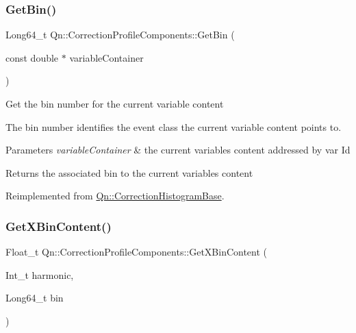 \subsubsection{\texorpdfstring{Get\+Bin()}{GetBin()}}
{\footnotesize\ttfamily Long64\+\_\+t Qn\+::\+Correction\+Profile\+Components\+::\+Get\+Bin (\begin{DoxyParamCaption}\item[{const double $\ast$}]{variable\+Container }\end{DoxyParamCaption})\hspace{0.3cm}{\ttfamily [virtual]}}

Get the bin number for the current variable content

The bin number identifies the event class the current variable content points to.


\begin{DoxyParams}{Parameters}
{\em variable\+Container} & the current variables content addressed by var Id \\
\hline
\end{DoxyParams}
\begin{DoxyReturn}{Returns}
the associated bin to the current variables content 
\end{DoxyReturn}


Reimplemented from \mbox{\hyperlink{classQn_1_1CorrectionHistogramBase_ab1f64550f4e1812864da6f9f6ea565e6}{Qn\+::\+Correction\+Histogram\+Base}}.

\mbox{\label{classQn_1_1CorrectionProfileComponents_a9641c29b1ceebb6c7a2e9137b27439f3}} 
\subsubsection{\texorpdfstring{Get\+X\+Bin\+Content()}{GetXBinContent()}}
{\footnotesize\ttfamily Float\+\_\+t Qn\+::\+Correction\+Profile\+Components\+::\+Get\+X\+Bin\+Content (\begin{DoxyParamCaption}\item[{Int\+\_\+t}]{harmonic,  }\item[{Long64\+\_\+t}]{bin }\end{DoxyParamCaption})\hspace{0.3cm}{\ttfamily [virtual]}}

